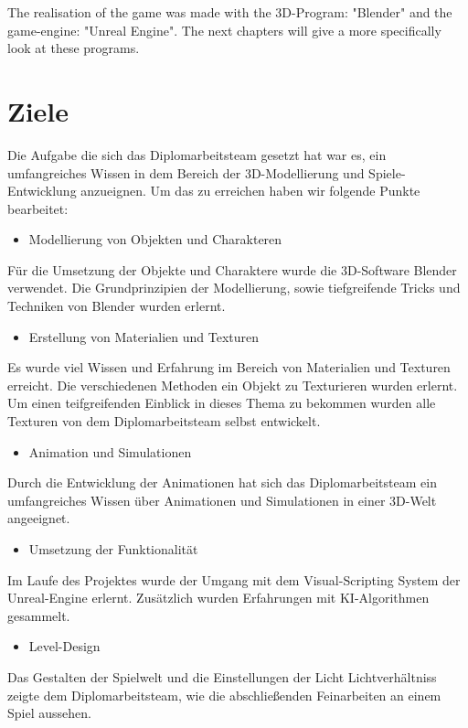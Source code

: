 The realisation of the game was made with the 3D-Program: "Blender" and the game-engine: "Unreal Engine".
The next chapters will give a more specifically look at these programs.


\section{Ziele}
Die Aufgabe die sich das Diplomarbeitsteam gesetzt hat war es, ein umfangreiches Wissen in dem
Bereich der 3D-Modellierung und Spiele-Entwicklung anzueignen.
Um das zu erreichen haben wir folgende Punkte bearbeitet:

\begin{itemize}
    \item  Modellierung von Objekten und Charakteren
\end{itemize}
Für die Umsetzung der Objekte und Charaktere wurde die 3D-Software Blender verwendet.
Die Grundprinzipien der Modellierung, sowie tiefgreifende Tricks und Techniken von Blender wurden erlernt.

\begin{itemize}
    \item  Erstellung von Materialien und Texturen
\end{itemize}
Es wurde viel Wissen und Erfahrung im Bereich von Materialien und Texturen erreicht.
Die verschiedenen Methoden ein Objekt zu Texturieren wurden erlernt.
Um einen teifgreifenden Einblick in dieses Thema zu bekommen wurden alle Texturen von dem Diplomarbeitsteam selbst entwickelt.

\begin{itemize}
    \item  Animation und Simulationen
\end{itemize}
Durch die Entwicklung der Animationen hat sich das Diplomarbeitsteam ein umfangreiches Wissen über Animationen und
Simulationen in einer 3D-Welt angeeignet.

\begin{itemize}
    \item Umsetzung der Funktionalität
\end{itemize}
Im Laufe des Projektes wurde der Umgang mit dem Visual-Scripting System der Unreal-Engine erlernt.
Zusätzlich wurden Erfahrungen mit KI-Algorithmen gesammelt.

\begin{itemize}
    \item Level-Design
\end{itemize}
Das Gestalten der Spielwelt und die Einstellungen der Licht Lichtverhältniss zeigte dem Diplomarbeitsteam, wie die
abschließenden Feinarbeiten an einem Spiel aussehen.
